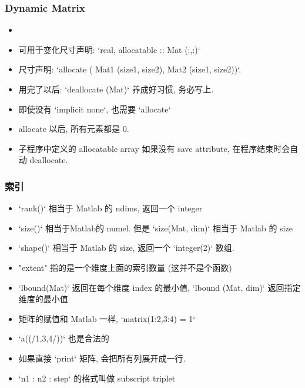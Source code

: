 \subsubsection{Dynamic Matrix}
\begin{itemize}
\item \item 可用于变化尺寸声明: `real, allocatable :: Mat (:,:)`
\item 尺寸声明: `allocate ( Mat1 (size1, size2), Mat2 (size1, size2))`.
\item 用完了以后: `deallocate (Mat)` 养成好习惯, 务必写上.
\item 即使没有 `implicit none`, 也需要 `allocate`
\item allocate 以后, 所有元素都是 0.
\item 子程序中定义的 allocatable array 如果没有 save attribute, 在程序结束时会自动 deallocate.
\end{itemize}

\subsubsection{索引}
\begin{itemize}
\item `rank()` 相当于 Matlab 的 ndims, 返回一个 integer
\item `size()` 相当于Matlab的 numel. 但是 `size(Mat, dim)` 相当于 Matlab 的 size
\item `shape()` 相当于 Matlab 的 size, 返回一个 `integer(2)` 数组.
\item "extent" 指的是一个维度上面的索引数量 (这并不是个函数)
\item `lbound(Mat)` 返回在每个维度 index 的最小值, `lbound (Mat, dim)` 返回指定维度的最小值
\item 矩阵的赋值和 Matlab 一样, `matrix(1:2,3:4) = 1`
\item `a((/1,3,4/))` 也是合法的
\item 如果直接 `print` 矩阵, 会把所有列展开成一行.
\item `n1 : n2 : step` 的格式叫做 subscript triplet
\end{itemize}

